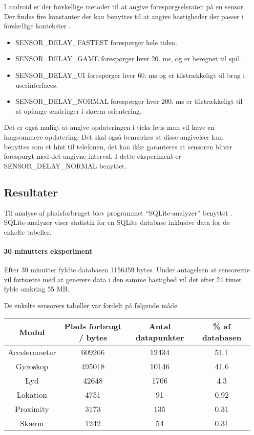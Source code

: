 I android er der forskellige metoder til at angive forespørgselsraten på en sensor.
Der findes fire konstanter der kan benyttes til at angive hastigheder der passer i forskellige kontekster \cite{sensormonitor}.

\begin{itemize}
	\item SENSOR\_DELAY\_FASTEST forespørger hele tiden.
	\item SENSOR\_DELAY\_GAME forespørger hver 20. ms, og er beregnet til spil.
	\item SENSOR\_DELAY\_UI forespørger hver 60. ms og er tilstrækkeligt til brug i userinterfaces.
	\item SENSOR\_DELAY\_NORMAL forespørger hver 200. ms er tilstrækkeligt til at opfange ændringer i skærm orientering.
\end{itemize}
Det er også muligt at angive opdateringen i ticks hvis man vil have en langsommere opdatering.
Det skal også bemærkes at disse angivelser kun benyttes som et hint til telefonen, det kan ikke garanteres at sensoren bliver forespurgt med det angivne interval.
I dette eksperiment er SENSOR\_DELAY\_NORMAL benyttet.


\subsection{Resultater}
Til analyse af pladsforbruget blev programmet ``SQLite-analyzer'' benyttet \cite{sqliteanalyzer}.
SQLite-analyzer viser statistik for en SQLite database inklusive data for de enkelte tabeller.

\paragraph{30 minutters eksperiment}
Efter 30 minutter fyldte databasen 1156459 bytes.
Under antagelsen at sensorerne vil fortsætte med at generere data i den samme hastighed vil det efter 24 timer fylde omkring 55 MB. 

De enkelte sensorers tabeller var fordelt på følgende måde

\begin{tabular}{|c|c|c|c|}
	\hline Modul & Plads forbrugt / bytes & Antal datapunkter & \% af databasen \\
	\hline Accelerometer & 609266 & 12434 & 51.1 \\ 
	\hline Gyroskop & 495018 & 10146 & 41.6\\ 
	\hline Lyd & 42648 & 1706 & 4.3 \\ 
	\hline Lokation & 4751 & 91 & 0.92 \\ 
	\hline Proximity & 3173 & 135 & 0.31 \\ 
	\hline Skærm & 1242 & 54 & 0.31 \\ 
	\hline 
\end{tabular} 

